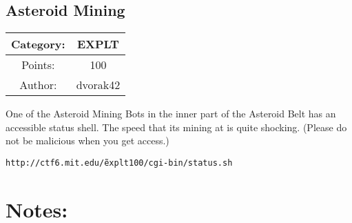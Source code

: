 \begin{center}
\section*{Asteroid Mining}
{\large
\begin{tabular}{| c c |}
\hline
Category: & EXPLT\\\hline
Points: & 100\\\hline
Author: & dvorak42\\\hline
\end{tabular}
}
\end{center}
\vspace{0.5in}

{\large
One of the Asteroid Mining Bots in the inner part of the Asteroid Belt has an accessible status shell. The speed that its mining at is quite shocking. (Please do not be malicious when you get access.)
}
\vspace{0.25in}
\begin{center}
  {\Large\tt http://ctf6.mit.edu/\~explt100/cgi-bin/status.sh}
\end{center}

\vspace{0.25in}
\section*{Notes:}
